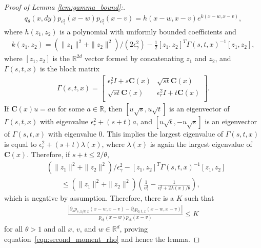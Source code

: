 \documentclass[EJP]{ejpecp} %
\newcommand{\IR}{\mathbb R}
\newcommand{\covq}{\mathbf{C}}     %
\begin{document}
\begin{proof}[Proof of Lemma \ref{lem:gamma_bound}:]
\begin{align*}
{            q_\theta(x, dy)
        }{
            p_{\epsilon_\gamma^2}(x - w)
            p_{\epsilon_\gamma^2}(x - v)
        }
        =
        h(x-w, x-v) e^{ k(x-w, x-v) },
    \end{align*}
    where $h(z_1, z_2)$ is a polynomial with uniformly bounded coefficients and
    \begin{align*}
        k(z_1, z_2)
        =
        (\|z_1\|^2 + \|z_2\|^2)/(2 \epsilon_\gamma^2)
            - \frac{1}{2} [z_1, z_2]^T \Gamma(s, t, x)^{-1} [z_1, z_2] ,
    \end{align*}
    where $[z_1, z_2]$ is the $\IR^{2d}$ vector formed by concatenating $z_1$ and $z_2$,
    and $\Gamma(s, t, x)$ is the block matrix
    \begin{align*}
        \Gamma(s, t, x)
        =
        \left[
        \begin{array}{cc}
            \epsilon_r^2 I + s \covq(x) & \sqrt{st} \covq(x) \\
            \sqrt{st} \covq(x) & \epsilon_r^2 I + t \covq(x) \\
        \end{array}
        \right] .
    \end{align*}
    If $\covq(x) u = a u$ for some $a \in \IR$,
    then $[u \sqrt{s}, u \sqrt{t}]$ is an eigenvector of $\Gamma(s, t, x)$
    with eigenvalue $\epsilon^2_r + (s+t) a$,
    and $[u \sqrt{t}, - u \sqrt{s}]$ is an eigenvector of $\Gamma(s, t, x)$
    with eigenvalue 0.
    This implies the largest eigenvalue of $\Gamma(s, t, x)$
    is equal to $\epsilon^2_r + (s+t) \lambda(x)$,
    where $\lambda(x)$ is again the largest eigenvalue of $\covq(x)$.
    Therefore, if $s + t \le 2 / \theta$,
    \begin{align*}
        &
        (\|z_1\|^2 + \|z_2\|^2) / \epsilon^2_\gamma
            - [z_1, z_2]^T \Gamma(s, t, x)^{-1} [z_1, z_2]
        \\ &\qquad \le
        (\|z_1\|^2 + \|z_2\|^2) \left(
            \frac{1}{\epsilon^2_\gamma}
            - \frac{1}{\epsilon^2_r +  2\lambda(x)/\theta}
        \right) ,
    \end{align*}
    which is negative by assumption.
    Therefore, there is a $K$ such that
    \begin{align*}
        \frac{ \left|
            \partial_s p_{s, 1/\theta, x}(x-w, x-v)
            - \partial_t p_{0, t, x}(x-w, x-v)
        \right| }{
            p_{\epsilon^2_\gamma}(x - w)
            p_{\epsilon^2_\gamma}(x - v)
        }
        \le K
    \end{align*}
    for all $\theta > 1$ and all $x$, $v$, and $w \in \IR^d$,
    proving equation~\eqref{eqn:second_moment_rho} and hence the lemma.
\end{proof}
\end{document}
